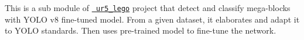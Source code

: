 This is a sub module of \href{https://github.com/AlphaNightLight/ur5_lego}{\texttt{ ur5\+\_\+lego}} project that detect and classify mega-\/blocks with Y\+O\+LO v8 fine-\/tuned model. From a given dataset, it elaborates and adapt it to Y\+O\+LO standards. Then uses pre-\/trained model to fine-\/tune the network. 